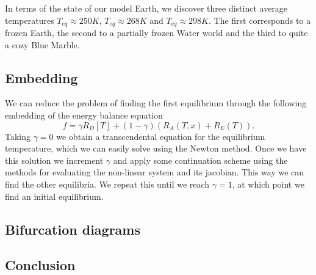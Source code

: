 In terms of the state of our model Earth, we discover three distinct average temperatures $T_{eq} \approx 250 K$, $T_{eq} \approx 268 K$ and $T_{eq} \approx 298 K$.
The first corresponds to a frozen Earth, the second to a partially frozen Water world and the third to quite a cozy Blue Marble.

\subsection{Embedding}
    We can reduce the problem of finding the first equilibrium through the following embedding of the energy balance equation
    \begin{equation}
        f = \gamma R_D[T] + (1-\gamma)(R_A(T, x) + R_E(T)).
    \end{equation}
    Taking $\gamma = 0$ we obtain a transcendental equation for the equilibrium temperature, which we can easily solve using the Newton method.
    Once we have this solution we increment $\gamma$ and apply some continuation scheme using the methods for evaluating the non-linear system and
    its jacobian. This way we can find the other equilibria. We repeat this until we reach $\gamma = 1$, at which point we find an initial equilibrium.
    
\subsection{Bifurcation diagrams}

\subsection{Conclusion}